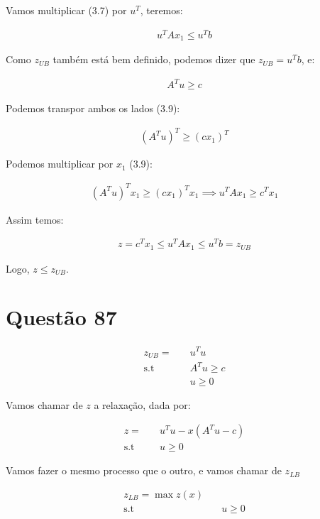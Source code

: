 \documentclass[]{article}
\numberwithin{equation}{section}
\begin{document}
Vamos multiplicar (3.7) por $u^T$, teremos:

\begin{align}
     u^TAx_1 \leq u^Tb
\end{align}

Como $z_{UB}$ também está bem definido, podemos dizer que $z_{UB} = u^Tb$, e:

\begin{align}
    A^Tu \geq c
\end{align}

Podemos transpor ambos os lados (3.9):

\begin{align}
    (A^Tu)^T \geq (cx_1)^T
\end{align}

Podemos multiplicar por $x_1$ (3.9):

\begin{align}
    (A^Tu)^Tx_1 \geq (cx_1)^Tx_1 \implies  u^TAx_1 \geq c^Tx_1
\end{align}

Assim temos:

\begin{align}
    z = c^Tx_1 \leq u^TAx_1 \leq u^Tb = z_{UB}
\end{align}

Logo, $z \leq z_{UB}$.

\section{Questão 87}

\begin{align}
z_{UB} =    &\quad  u^Tu       \\
\text{s.t}  &\quad  A^Tu \geq c  \\
            &\quad  u \geq 0
\end{align}

Vamos chamar de $z$ a relaxação, dada por:

\begin{align}
z = &\quad  u^Tu - x(A^Tu - c)       \\
\text{s.t}  &\quad  u \geq 0
\end{align}

Vamos fazer o mesmo processo que o outro, e vamos chamar de $z_{LB}$

\begin{align}
z_{LB} = \max z(x)       \\
\text{s.t}  &\quad  u \geq 0
\end{align}
\end{document}
